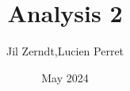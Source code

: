 \documentclass[a4paper, fontsize = 8pt, landscape]{scrartcl}
\title{Analysis 2}
\author{Jil Zerndt,Lucien Perret}
\date{May 2024}
\begin{document}
\begin{multicols*}{3}
	\thispagestyle{TitlePageStyle}
	\maketitle
	
	\raggedcolumns
	
	\raggedcolumns
	
	\raggedcolumns
	
\end{multicols*}
\end{document}
